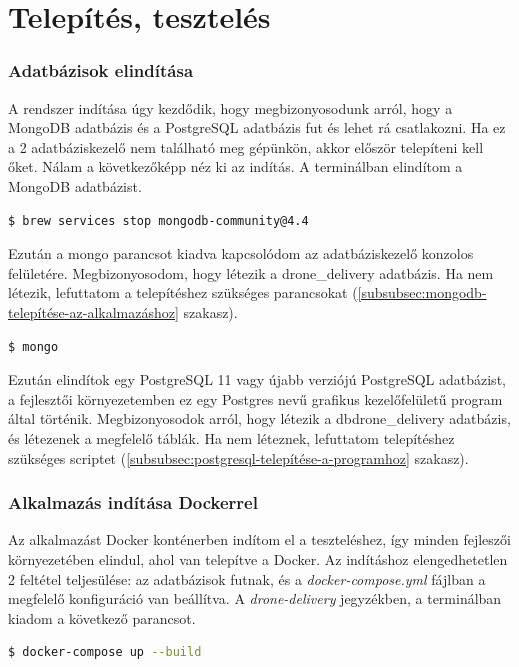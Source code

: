 \section{Telepítés, tesztelés}
\subsubsection{Adatbázisok elindítása}
A rendszer indítása úgy kezdődik, hogy megbizonyosodunk arról, hogy a MongoDB adatbázis és a PostgreSQL adatbázis fut és lehet rá csatlakozni.
Ha ez a 2 adatbáziskezelő nem található meg gépünkön, akkor először telepíteni kell őket.
Nálam a következőképp néz ki az indítás. A terminálban elindítom a MongoDB adatbázist.
\begin{lstlisting}[language=bash]
  $ brew services stop mongodb-community@4.4
\end{lstlisting}

Ezután a mongo parancsot kiadva kapcsolódom az adatbáziskezelő konzolos felületére.
Megbizonyosodom, hogy létezik a drone\_delivery adatbázis.
Ha nem létezik, lefuttatom a telepítéshez szükséges parancsokat (\ref{subsubsec:mongodb-telepítése-az-alkalmazáshoz} szakasz).
\begin{lstlisting}[language=bash]
  $ mongo
\end{lstlisting}


Ezután elindítok egy PostgreSQL 11 vagy újabb verziójú PostgreSQL adatbázist, a fejlesztői környezetemben ez egy Postgres nevű grafikus kezelőfelületű program által történik.
Megbizonyosodok arról, hogy létezik a dbdrone\_delivery adatbázis, és létezenek a megfelelő táblák.
Ha nem léteznek, lefuttatom telepítéshez szükséges scriptet (\ref{subsubsec:postgresql-telepítése-a-programhoz} szakasz).

\subsubsection{Alkalmazás indítása Dockerrel}
Az alkalmazást Docker konténerben indítom el a teszteléshez, így minden fejleszői környezetében elindul, ahol van telepítve a Docker.
Az indításhoz elengedhetetlen 2 feltétel teljesülése: az adatbázisok futnak, és a \textit{docker-compose.yml} fájlban a megfelelő konfiguráció van beállítva.
A \textit{drone-delivery} jegyzékben, a terminálban kiadom a következő parancsot.
\begin{lstlisting}[language=bash]
  $ docker-compose up --build
\end{lstlisting}

